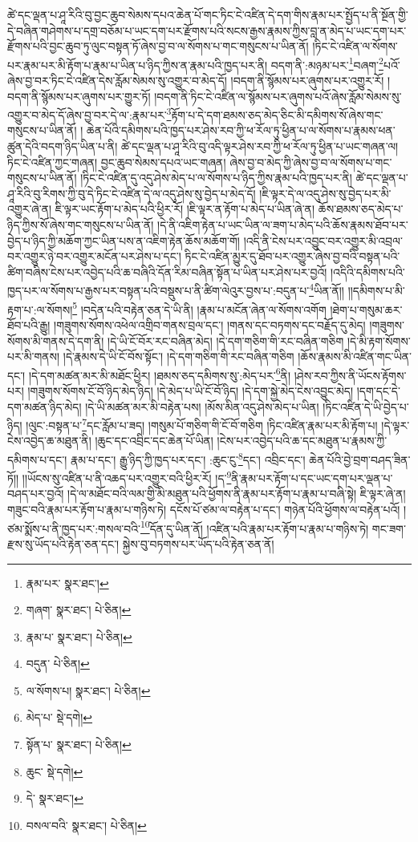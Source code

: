ཚེ་དང་ལྡན་པ་ཤཱ་རིའི་བུ་བྱང་ཆུབ་སེམས་དཔའ་ཆེན་པོ་གང་ཏིང་ངེ་འཛིན་དེ་དག་གིས་རྣམ་པར་སྤྱོད་པ་ནི་སྔོན་གྱི་དེ་བཞིན་གཤེགས་པ་དགྲ་བཅོམ་པ་ཡང་དག་པར་རྫོགས་པའི་སངས་རྒྱས་རྣམས་ཀྱིས་བླ་ན་མེད་པ་ཡང་དག་པར་རྫོགས་པའི་བྱང་ཆུབ་ཏུ་ལུང་བསྟན་ཏོ་ཞེས་བྱ་བ་ལ་སོགས་པ་གང་གསུངས་པ་ཡིན་ནོ། །ཏིང་ངེ་འཛིན་ལ་སོགས་པར་རྣམ་པར་མི་རྟོག་པ་རྣམ་པ་ཡིན་པ་ཉིད་ཀྱིས་ན་རྣམ་པའི་ཁྱད་པར་ནི། བདག་ནི་:མཉམ་པར་\footnote{རྣམ་པར་  སྣར་ཐང་། }བཞག་\footnote{གཞག་  སྣར་ཐང་།  པེ་ཅིན། }པའོ་ཞེས་བྱ་བར་ཏིང་ངེ་འཛིན་དེས་རློམ་སེམས་སུ་འགྱུར་བ་མེད་དོ། །བདག་ནི་སྙོམས་པར་ཞུགས་པར་འགྱུར་རོ། །བདག་ནི་སྙོམས་པར་ཞུགས་པར་གྱུར་ཏོ། །བདག་ནི་ཏིང་ངེ་འཛིན་ལ་སྙོམས་པར་ཞུགས་པའོ་ཞེས་རློམ་སེམས་སུ་འགྱུར་བ་མེད་དོ་ཞེས་བྱ་བར་དེ་ལ་:རྣམ་པར་\footnote{རྣམ་པ་  སྣར་ཐང་།  པེ་ཅིན། }རྟོག་པ་དེ་དག་ཐམས་ཅད་མེད་ཅིང་མི་དམིགས་སོ་ཞེས་གང་གསུངས་པ་ཡིན་ནོ། །
ཆེན་པོའི་དམིགས་པའི་ཁྱད་པར་ཤེས་རབ་ཀྱི་ཕ་རོལ་ཏུ་ཕྱིན་པ་ལ་སོགས་པ་རྣམས་ཕན་ཚུན་དེའི་བདག་ཉིད་ཡིན་པ་ནི། ཚེ་དང་ལྡན་པ་ཤཱ་རིའི་བུ་འདི་ལྟར་ཤེས་རབ་ཀྱི་ཕ་རོལ་ཏུ་ཕྱིན་པ་ཡང་གཞན་ལ། ཏིང་ངེ་འཛིན་ཀྱང་གཞན། བྱང་ཆུབ་སེམས་དཔའ་ཡང་གཞན། ཞེས་བྱ་བ་མེད་ཀྱི་ཞེས་བྱ་བ་ལ་སོགས་པ་གང་གསུངས་པ་ཡིན་ནོ། །ཏིང་ངེ་འཛིན་དུ་འདུ་ཤེས་མེད་པ་ལ་སོགས་པ་ཉིད་ཀྱིས་རྣམ་པའི་ཁྱད་པར་ནི། ཚེ་དང་ལྡན་པ་ཤཱ་རིའི་བུ་རིགས་ཀྱི་བུ་དེ་ཏིང་ངེ་འཛིན་དེ་ལ་འདུ་ཤེས་སུ་བྱེད་པ་མེད་དོ། །ཇི་ལྟར་དེ་ལ་འདུ་ཤེས་སུ་བྱེད་པར་མི་འགྱུར་ཞེ་ན། ཇི་ལྟར་ཡང་རྟོག་པ་མེད་པའི་ཕྱིར་རོ། །ཇི་ལྟར་ན་རྟོག་པ་མེད་པ་ཡིན་ཞེ་ན། ཆོས་ཐམས་ཅད་མེད་པ་ཉིད་ཀྱིས་སོ་ཞེས་གང་གསུངས་པ་ཡིན་ནོ། །དེ་ནི་འཇིག་རྟེན་པ་ཡང་ཡིན་ལ་ཟག་པ་མེད་པའི་ཆོས་རྣམས་ཐོབ་པར་བྱེད་པ་ཉིད་ཀྱི་མཆོག་ཀྱང་ཡིན་པས་ན་འཇིག་རྟེན་ཆོས་མཆོག་གོ། །འདི་ནི་ངེས་པར་འབྱུང་བར་འགྱུར་མི་འབྲལ་བར་འགྱུར་ཉེ་བར་འགྱུར་མངོན་པར་ཤེས་པ་དང་། ཏིང་ངེ་འཛིན་མྱུར་དུ་ཐོབ་པར་འགྱུར་ཞེས་བྱ་བའི་བསྟན་པའི་ཚིག་བཞིས་ངེས་པར་འབྱེད་པའི་ཆ་བཞིའི་དོན་རིམ་བཞིན་སྟོན་པ་ཡིན་པར་ཤེས་པར་བྱའོ། །འདིའི་དམིགས་པའི་ཁྱད་པར་ལ་སོགས་པ་རྒྱས་པར་བསྟན་པའི་བསྡུས་པ་ནི་ཚིག་ལེའུར་བྱས་པ་:བདུན་པ་\footnote{བདུན་  པེ་ཅིན། }ཡིན་ནོ།། །།དམིགས་པ་མི་རྟག་པ་:ལ་སོགས།\footnote{ལ་སོགས་པ།  སྣར་ཐང་།  པེ་ཅིན། } །བདེན་པའི་བརྟེན་ཅན་དེ་ཡི་ནི། །རྣམ་པ་མངོན་ཞེན་ལ་སོགས་འགོག །ཐེག་པ་གསུམ་ཆར་ཐོབ་པའི་རྒྱུ། །གཟུགས་སོགས་འཕེལ་འགྲིབ་གནས་བྲལ་དང་། །གནས་དང་བཏགས་དང་བརྗོད་དུ་མེད། །གཟུགས་སོགས་མི་གནས་དེ་དག་ནི། །དེ་ཡི་ངོ་བོར་རང་བཞིན་མེད། །དེ་དག་གཅིག་གི་རང་བཞིན་གཅིག །དེ་མི་རྟག་སོགས་པར་མི་གནས། །དེ་རྣམས་དེ་ཡི་ངོ་བོས་སྟོང་། །དེ་དག་གཅིག་གི་རང་བཞིན་གཅིག །ཆོས་རྣམས་མི་འཛིན་གང་ཡིན་དང་། །དེ་དག་མཚན་མར་མི་མཐོང་ཕྱིར། །ཐམས་ཅད་དམིགས་སུ་:མེད་པར་\footnote{མེད་པ་  སྡེ་དགེ། }ནི། །ཤེས་རབ་ཀྱིས་ནི་ཡོངས་རྟོགས་པར། །གཟུགས་སོགས་ངོ་བོ་ཉིད་མེད་ཉིད། །དེ་མེད་པ་ཡི་ངོ་བོ་ཉིད། །དེ་དག་སྐྱེ་མེད་ངེས་འབྱུང་མེད། །དག་དང་དེ་དག་མཚན་ཉིད་མེད། །དེ་ཡི་མཚན་མར་མི་བརྟེན་པས། །མོས་མིན་འདུ་ཤེས་མེད་པ་ཡིན། །ཏིང་འཛིན་དེ་ཡི་བྱེད་པ་ཉིད། །ལུང་:བསྟན་པ་\footnote{སྟོན་པ་  སྣར་ཐང་།  པེ་ཅིན། }དང་རློམ་པ་ཟད། །གསུམ་པོ་གཅིག་གི་ངོ་བོ་གཅིག །ཏིང་འཛིན་རྣམ་པར་མི་རྟོག་པ། །དེ་ལྟར་ངེས་འབྱེད་ཆ་མཐུན་ནི། །ཆུང་དང་འབྲིང་དང་ཆེན་པོ་ཡིན། །ངེས་པར་འབྱེད་པའི་ཆ་དང་མཐུན་པ་རྣམས་ཀྱི་དམིགས་པ་དང་། རྣམ་པ་དང་། རྒྱུ་ཉིད་ཀྱི་ཁྱད་པར་དང་། :ཆུང་ངུ་\footnote{ཆུང་  སྡེ་དགེ། }དང་། འབྲིང་དང་། ཆེན་པོའི་བྱེ་བྲག་བཤད་ཟིན་ཏོ།། །།ཡོངས་སུ་འཛིན་པ་ནི་འཆད་པར་འགྱུར་བའི་ཕྱིར་རོ། །ད་\footnote{དེ་  སྣར་ཐང་། }ནི་རྣམ་པར་རྟོག་པ་དང་ཡང་དག་པར་ལྡན་པ་བཤད་པར་བྱའོ། །དེ་ལ་མཐོང་བའི་ལམ་གྱི་མི་མཐུན་པའི་ཕྱོགས་ནི་རྣམ་པར་རྟོག་པ་རྣམ་པ་བཞི་སྟེ། ཇི་ལྟར་ཞེ་ན། གཟུང་བའི་རྣམ་པར་རྟོག་པ་རྣམ་པ་གཉིས་ཏེ། དངོས་པོ་ཙམ་ལ་བརྟེན་པ་དང་། གཉེན་པོའི་ཕྱོགས་ལ་བརྟེན་པའོ། །ཙམ་སྨོས་པ་ནི་ཁྱད་པར་:གསལ་བའི་\footnote{བསལ་བའི་  སྣར་ཐང་།  པེ་ཅིན། }དོན་དུ་ཡིན་ནོ། །འཛིན་པའི་རྣམ་པར་རྟོག་པ་རྣམ་པ་གཉིས་ཏེ། གང་ཟག་རྫས་སུ་ཡོད་པའི་རྟེན་ཅན་དང་། སྐྱེས་བུ་བཏགས་པར་ཡོད་པའི་རྟེན་ཅན་ནོ། 